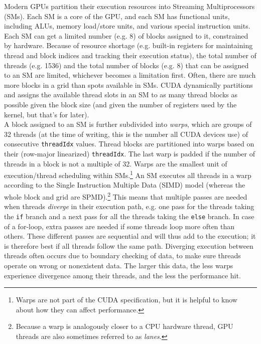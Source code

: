 \documentclass[8pt, table, xcdraw]{article}%
\begin{document}
Modern GPUs partition their execution resources into Streaming Multiprocessors (SMs). Each SM is a core of the GPU, and each SM has functional units, including ALUs, memory load/store units, and various special instruction units. Each SM can get a limited number (e.g. 8) of blocks assigned to it, constrained by hardware. Because of resource shortage (e.g. built-in registers for maintaining thread and block indices and tracking their execution status), the total number of threads (e.g. 1536) and the total number of blocks (e.g. 8) that can be assigned to an SM are limited, whichever becomes a limitation first. Often, there are much more blocks in a grid than spots available in SMs. CUDA dynamically partitions and assigns the available thread slots in an SM to as many thread blocks as possible given the block size (and given the number of registers used by the kernel, but that's for later).\\
A block assigned to an SM is further subdivided into \emph{warps}, which are groups of 32 threads (at the time of writing, this is the number all CUDA devices use) of consecutive \lstinline{threadIdx} values. Thread blocks are partitioned into warps based on their (row-major linearized) \lstinline{threadIdx}. The last warp is padded if the number of threads in a block is not a multiple of 32. Warps are the smallest unit of execution/thread scheduling within SMs.\footnote{Warps are not part of the CUDA specification, but it is helpful to know about how they can affect performance.} An SM executes all threads in a warp according to the Single Instruction Multiple Data (SIMD) model (whereas the whole block and grid are SPMD).\footnote{Because a warp is analogously closer to a CPU hardware thread, GPU threads are also sometimes referred to as \emph{lanes}.} This means that multiple passes are needed when threads \emph{diverge} in their execution path, e.g. one pass for the threads taking the \lstinline{if} branch and a next pass for all the threads taking the \lstinline{else} branch. In case of a for-loop, extra passes are needed if some threads loop more often than others. These different passes are sequential and will thus add to the execution; it is therefore best if all threads follow the same path. Diverging execution between threads often occurs due to boundary checking of data, to make sure threads operate on wrong or nonexistent data. The larger this data, the less warps experience divergence among their threads, and the less the performance hit.\\
\end{document}
